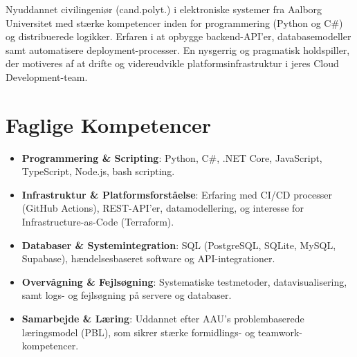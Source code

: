 \documentclass[11pt,a4paper,sans]{moderncv}
\begin{document}
\makecvtitle


\vspace{6pt}
\small{Nyuddannet civilingeniør (cand.polyt.) i elektroniske systemer fra Aalborg Universitet med stærke kompetencer inden for programmering (Python og C\#) og distribuerede logikker. Erfaren i at opbygge backend-API'er, databasemodeller samt automatisere deployment-processer. En nysgerrig og pragmatisk holdspiller, der motiveres af at drifte og videreudvikle platformsinfrastruktur i jeres Cloud Development-team.}


\section{Faglige Kompetencer}
\vspace{1pt}
\begin{itemize}

\item \textbf{Programmering \& Scripting}: Python, C\#, .NET Core, JavaScript, TypeScript, Node.js, bash scripting.

\item \textbf{Infrastruktur \& Platformsforståelse}: Erfaring med CI/CD processer (GitHub Actions), REST-API'er, datamodellering, og interesse for Infrastructure-as-Code (Terraform).

\item \textbf{Databaser \& Systemintegration}: SQL (PostgreSQL, SQLite, MySQL, Supabase), hændelsesbaseret software og API-integrationer.

\item \textbf{Overvågning \& Fejlsøgning}: Systematiske testmetoder, datavisualisering, samt logs- og fejlsøgning på servere og databaser.

\item \textbf{Samarbejde \& Læring}: Uddannet efter AAU's problembaserede læringsmodel (PBL), som sikrer stærke formidlings- og teamwork-kompetencer.

\end{itemize}

\end{document}

